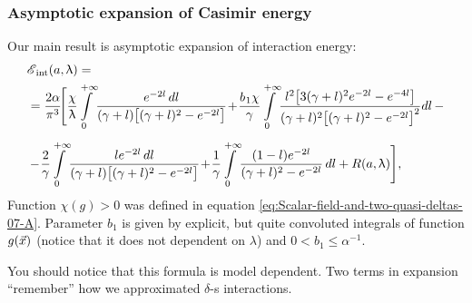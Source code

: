\documentclass[10pt,t]{beamer}
\begin{document}
\begin{frame}
  \frametitle{Asymptotic expansion of Casimir energy}



  Our main result is asymptotic expansion of interaction energy:
  \begin{equation}
    \label{eq:Rescaled-version-of-the-model-04}
    \begin{split}
      &\EInt( a, \lambda ) = \\
      &=
        \frac{ 2 \alpha }{ \pi^{ 3 } } \! \Bigg[ \frac{ \chi }{ \lambda } \!
        \int\limits_{ 0 }^{ +\infty } \!
        \frac{ e^{ -2 l } \, dl }{ ( \gamma + l )
        \big[ ( \gamma + l )^{ 2 } - e^{ -2 l } \big] } \! + \!
        \frac{ b_{ \HorSpaceOne 1 } \chi }{ \gamma } \!
        \int\limits_{ 0 }^{ +\infty } \!
        \frac{ l^{ 2 } \big[ 3 ( \gamma + l )^{ 2 } e^{ -2 l } -
        e^{ -4 l } \big] }
        { ( \gamma + l )^{ 2 }
        \big[ ( \gamma + l )^{ 2 } - e^{ -2 l } \big]^{ 2 } } dl
        \, - \\[0.5em]
      &- \! \frac{ 2 }{ \gamma } \! \int\limits_{ 0 }^{ +\infty } \!
        \frac{ l e^{ -2 l }\, dl }{ ( \gamma + l )
        \big[ ( \gamma + l )^{ 2 } - e^{ -2 l } \big] } \! + \!
        \frac{ 1 }{ \gamma } \!
        \int\limits_{ 0 }^{ +\infty } \! \frac{ ( 1 - l ) e^{ -2 l } }{
        ( \gamma + l )^{ 2 } - e^{ -2 l } } \, dl + R( a, \lambda ) \Bigg],
    \end{split}
  \end{equation}
  Function $\chi( g ) > 0$ was defined in equation
  \eqref{eq:Scalar-field-and-two-quasi-deltas-07-A}. Parameter
  $b_{ 1 }$ is given by explicit, but quite convoluted integrals of function
  $g( \vec{x} )$ (notice that it does not dependent on $\lambda$) and
  $0 < b_{ 1 } \leq \alpha^{ -1 }$.

  You should notice that this formula is \alert{model dependent}. Two terms
  in expansion ``remember'' how we approximated $\delta$-s interactions.

\end{frame}
\end{document}
